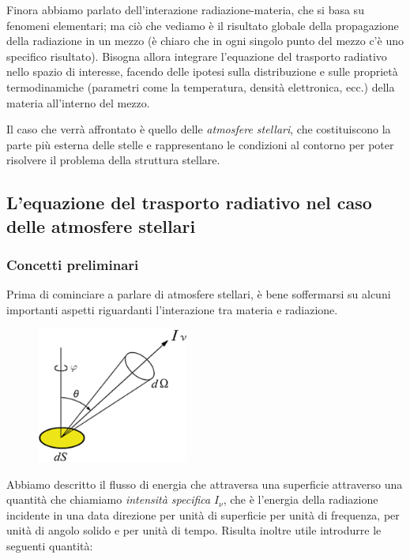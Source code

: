 Finora abbiamo parlato dell'interazione radiazione-materia, che si basa su fenomeni elementari; ma ciò che vediamo è il risultato globale della propagazione della radiazione in un mezzo (è chiaro che in ogni singolo punto del mezzo c'è uno specifico risultato). Bisogna allora integrare l'equazione del trasporto radiativo nello spazio di interesse, facendo delle ipotesi sulla distribuzione e sulle proprietà termodinamiche (parametri come la temperatura, densità elettronica, ecc.) della materia all'interno del mezzo.

Il caso che verrà affrontato è quello delle \textit{atmosfere stellari}, che costituiscono la parte più esterna delle stelle e rappresentano le condizioni al contorno per poter risolvere il problema della struttura stellare.
\subsection{L'equazione del trasporto radiativo nel caso delle atmosfere stellari}

\subsubsection{Concetti preliminari}

Prima di cominciare a parlare di atmosfere stellari, è bene soffermarsi su alcuni importanti aspetti riguardanti l'interazione tra materia e radiazione.

\begin{minipage}{0.495\textwidth}
    \begin{figure}[H]
        \centering
        \includegraphics[width=5cm]{cono radiazione.png}
    \end{figure}
\end{minipage}
\begin{minipage}{0.5\textwidth}
    Abbiamo descritto il flusso di energia che attraversa una superficie attraverso una quantità che chiamiamo \textit{intensità specifica} ${I_\nu}$, che è l'energia della radiazione incidente in una data direzione per unità di superficie per unità di frequenza, per unità di angolo solido e per unità di tempo. Risulta inoltre utile introdurre le seguenti quantità:
\end{minipage}

